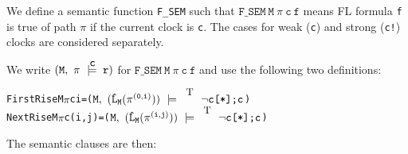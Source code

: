 \documentclass{llncs}
\newcommand{\T}{\texttt{\small\rm{T}}}
\newcommand{\bTrue}{\T}
\renewcommand{\Pi}{\(\pi\)}
\newcommand{\SSem}[4]{(\(\tt{#1,~#2~\models^{\hspace*{-2.3mm}\raisebox{1mm}{\tt#3}}~#4}\))}
\newcommand{\fSem}[4]{(\tt{#1,~#2~\models^{\hspace*{-2.3mm}\raisebox{1mm}{\tt#3}}~#4})}
\newcommand{\Fsem}{\texttt{F\_SEM}\xspace}
\newcommand{\bNot}[1]{\neg#1}
\newcommand{\pathSeg}[2]{#1^{#2}}
\newcommand{\lHat}[1]{\hat{\texttt{L}}_{#1}}
\newcommand{\sBool}[1]{#1}
\newcommand{\sRepeat}[1]{#1\texttt{[*]}}
\newcommand{\sCat}[2]{#1\texttt{;}#2}
\renewcommand{\t}[1]{\texttt{#1}}
\begin{document}
We define a semantic function \Fsem such that $\Fsem~\t{M}~\pi~\t{c}~\t{f}$
means FL formula \t{f} is true of path $\pi$ if the current clock is \t{c}.
The cases for weak (\t{c}) and strong (\t{c!}) clocks are considered separately.

\noindent We write $\fSem{M}{\pi}{c}{r}$ for $\Fsem~\t{M}~\pi~\t{c}~\t{f}$
and use the following two definitions:

\vspace*{-4.5mm}

{\begin{alltt}
   FirstRise M {\Pi} c i    = \SSem{M}{(\lHat{M} (\pathSeg{\pi}{(0,i)}))}{\bTrue}{\sCat{\sRepeat{\sBool{\bNot{c}}}}{\sBool{c}}}
   NextRise M {\Pi} c (i,j) = \SSem{M}{(\lHat{M} (\pathSeg{\pi}{(i,j)}))}{\bTrue}{\sCat{\sRepeat{\sBool{\bNot{c}}}}{\sBool{c}}}
\end{alltt}}

\vspace*{-3.5mm}

\noindent The semantic clauses are then:

\vspace*{-3.5mm}
\end{document}
